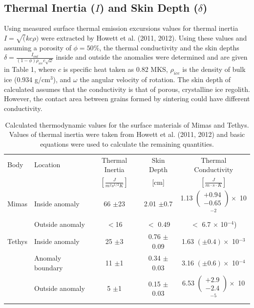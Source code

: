 \documentclass[11pt]{article} %
\begin{document}

\subsection{Thermal Inertia ($I$) and Skin Depth ($\delta$)}

		Using measured surface thermal emission excursions values for thermal inertia $I=\sqrt(kc\rho)$ were extracted by Howett et al. (2011, 2012). Using these values and assuming a porosity of $\phi = 50\%$, the thermal conductivity and the skin depths $\delta = \frac{I_{out}}{(1-\phi)\rho_{ice} c \sqrt{\omega}}$ inside and outside the anomalies were determined and are given in Table 1, where $c$ is specific heat taken as 0.82 MKS, $\rho_{ice}$ is the density of bulk ice (0.934 g/cm$^{3}$), and $\omega$ the angular velocity of rotation. The skin depth of calculated assumes that the conductivity is that of porous, crystalline ice regolith. However, the contact area between grains formed by sintering could have different conductivity. 
	
	\begin{table}[h]
		\centering
		\begin{tabular}[c]{ l | l | c | c | c }
		Body & Location & Thermal Inertia & Skin Depth & Thermal Conductivity \\
		& & $\left[ \frac{J}{m^{2} s^{1/2} K} \right]$ & [cm] & $\left[ \frac{J}{m\cdot s\cdot K} \right]$ \\ \hline
		Mimas & Inside anomaly & 66 $\pm$23 & 2.01 $\pm$0.7 & 1.13 $\left(\substack{+0.94 \\ -0.65} \right) \times$ 10$^{-2}$ \\
			& Outside anomaly & $<$16 & $<$ 0.49 & $<$ 6.7 $\times$ 10$^{-4}$) \\ \hline
		Tethys & Inside anomaly & 25 $\pm$3 & 0.76 $\pm$0.09 & 1.63 $(\pm 0.4) \times$ 10$^{-3}$ \\
			& Anomaly boundary & 11 $\pm$1 & 0.34 $\pm$0.03 & 3.16 $(\pm 0.6) \times$ 10$^{-4}$ \\
			& Outside anomaly & 5 $\pm$1 & 0.15 $\pm$0.03 & 6.53 $\left(\substack{+2.9 \\ -2.4} \right) \times$ 10$^{-5}$ \\
		\end{tabular}
		\caption{Calculated thermodynamic values for the surface materials of Mimas and Tethys. Values of thermal inertia were taken from Howett et al. (2011, 2012) and basic equations were used to calculate the remaining quantities.}
		\label{tab:therm}
	\end{table}
	
\end{document}
